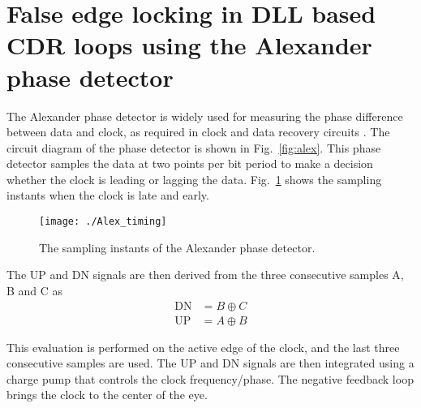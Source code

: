 \documentclass[journal,twoside,letterpaper]{IEEEtran}
\begin{document}
\appendices
\section{False edge locking in DLL based CDR loops using the Alexander phase detector}
\label{app:APD}
The Alexander phase detector is widely used for measuring the phase
difference between data and clock, as required in clock and data
recovery circuits \cite{CDR_razavi}. The circuit diagram of the
phase detector is shown in \mbox{Fig. \ref{fig:alex}}.
This phase detector samples the data at two points per bit period to
make a decision whether the clock is leading or lagging the data.
\mbox{Fig. \ref{fig:alex_sample}} shows the sampling instants
when the clock is late and early.

\begin{figure}[htb!]
\centering
\texttt{[image: ./Alex\_timing]}
\caption{The sampling instants of the Alexander phase detector.}
\label{fig:alex_sample}
\end{figure}

The UP and DN signals are then derived
from the three consecutive samples A, B and C as
\begin{align}
\text{DN} &= B \oplus C \nonumber \\ 
\text{UP} &= A \oplus B \nonumber
\end{align}

This evaluation is performed on the active edge of the clock,
and the last three consecutive samples are used.
The UP and DN signals are then integrated using a charge 
pump that controls the clock frequency/phase.
The negative feedback loop brings the clock to the 
center of the eye.
\end{document}
